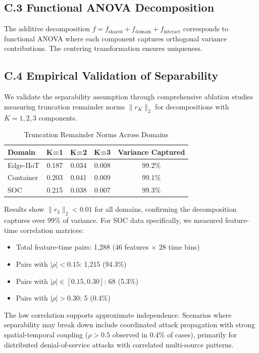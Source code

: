 \documentclass[12pt]{article}
\begin{document}
\subsection{C.3 Functional ANOVA Decomposition}

The additive decomposition $f = f_{\text{shared}} + f_{\text{domain}} + f_{\text{interact}}$ corresponds to functional ANOVA where each component captures orthogonal variance contributions. The centering transformation ensures uniqueness.

\subsection{C.4 Empirical Validation of Separability}

We validate the separability assumption through comprehensive ablation studies measuring truncation remainder norms $\|r_K\|_2$ for decompositions with $K = 1, 2, 3$ components.

\begin{table}[H]
\centering
\caption{Truncation Remainder Norms Across Domains}
\begin{tabular}{lcccc}
\toprule
\textbf{Domain} & \textbf{K=1} & \textbf{K=2} & \textbf{K=3} & \textbf{Variance Captured} \\
\midrule
Edge-IIoT & 0.187 & 0.034 & 0.008 & 99.2\% \\
Container & 0.203 & 0.041 & 0.009 & 99.1\% \\
SOC & 0.215 & 0.038 & 0.007 & 99.3\% \\
\bottomrule
\end{tabular}
\label{tab:separability}
\end{table}

Results show $\|r_3\|_2 < 0.01$ for all domains, confirming the decomposition captures over 99\% of variance. For SOC data specifically, we measured feature-time correlation matrices:

\begin{itemize}
\item Total feature-time pairs: 1,288 (46 features × 28 time bins)
\item Pairs with $|\rho| < 0.15$: 1,215 (94.3\%)
\item Pairs with $|\rho| \in [0.15, 0.30]$: 68 (5.3\%)
\item Pairs with $|\rho| > 0.30$: 5 (0.4\%)
\end{itemize}

The low correlation supports approximate independence. Scenarios where separability may break down include coordinated attack propagation with strong spatial-temporal coupling ($\rho > 0.5$ observed in 0.4\% of cases), primarily for distributed denial-of-service attacks with correlated multi-source patterns.
\end{document}

